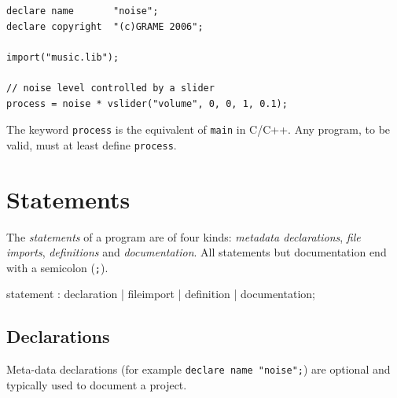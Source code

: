 \begin{lstlisting}
declare name       "noise";
declare copyright  "(c)GRAME 2006";

import("music.lib");

// noise level controlled by a slider
process = noise * vslider("volume", 0, 0, 1, 0.1);
\end{lstlisting}
 
The keyword \lstinline'process' is the equivalent of \lstinline'main' in C/C++. Any \faust program, to be valid, must at least define \lstinline'process'.

\section{Statements}

The \textit{statements} of a \faust program are of four kinds: \textit{metadata declarations}, \textit{file imports},  \textit{definitions} and \textit{documentation}. All statements but documentation end with a semicolon (\lstinline';'). 
% 

\begin{rail}
statement : declaration | fileimport | definition | documentation;
\end{rail}

\subsection{Declarations}

Meta-data declarations (for example \lstinline'declare name "noise";') are optional and typically used to document a \faust project. 

% 

